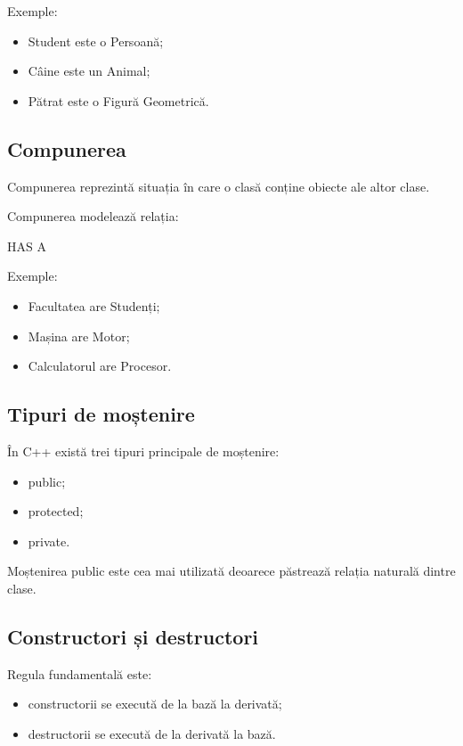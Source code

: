 \documentclass[12pt,a4paper]{article}
\begin{document}
Exemple:

\begin{itemize}
\item Student este o Persoană;
\item Câine este un Animal;
\item Pătrat este o Figură Geometrică.
\end{itemize}

\subsection{Compunerea}

Compunerea reprezintă situația în care o clasă conține obiecte ale altor clase.

Compunerea modelează relația:

\begin{center}
HAS A
\end{center}

Exemple:

\begin{itemize}
\item Facultatea are Studenți;
\item Mașina are Motor;
\item Calculatorul are Procesor.
\end{itemize}

\subsection{Tipuri de moștenire}

În C++ există trei tipuri principale de moștenire:

\begin{itemize}
\item public;
\item protected;
\item private.
\end{itemize}

Moștenirea public este cea mai utilizată deoarece păstrează relația naturală dintre clase.

\subsection{Constructori și destructori}

Regula fundamentală este:

\begin{itemize}
\item constructorii se execută de la bază la derivată;
\item destructorii se execută de la derivată la bază.
\end{itemize}
\end{document}
